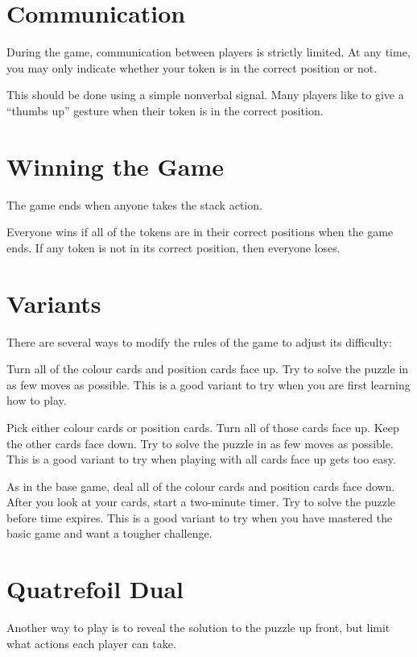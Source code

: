 \documentclass[a6paper, parskip=half, DIV=16, 10pt]{scrartcl}
\begin{document}
\section*{Communication}
During the game, communication between players is strictly limited. At any time, you may only indicate whether your token is in the correct position or not.

This should be done using a simple nonverbal signal. Many players like to give a ``thumbs up'' gesture when their token is in the correct position.%
\newpage
\section*{Winning the Game}
The game ends when anyone takes the stack action.

Everyone wins if all of the tokens are in their correct positions when the game ends. If any token is not in its correct position, then everyone loses.

\section*{Variants}
There are several ways to modify the rules of the game to adjust its difficulty:
\begin{description}[leftmargin=0pt, labelsep=\widthof{\ }]
	\item[Nothing to Hide -] Turn all of the colour cards and position cards face up. Try to solve the puzzle in as few moves as possible. This is a good variant to try when you are first learning how to play.
	\item[Half and Half -] Pick either colour cards or position cards. Turn all of those cards face up. Keep the other cards face down. Try to solve the puzzle in as few moves as possible. This is a good variant to try when playing with all cards face up gets too easy.
	\item[Race the Clock -] As in the base game, deal all of the colour cards and position cards face down. After you look at your cards, start a two-minute timer. Try to solve the puzzle before time expires. This is a good variant to try when you have mastered the basic game and want a tougher challenge.
\end{description}
\newpage
\section*{Quatrefoil Dual}
Another way to play is to reveal the solution to the puzzle up front, but limit what actions each player can take.
\end{document}
